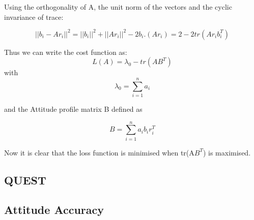 {{{Using the orthogonality of A, the unit norm of the vectors and the cyclic invariance of trace:

\begin{equation}
||b_{i}-Ar_{i}||^2 = ||b_{i}||^2 + ||Ar_{i}||^2 -2b_{i}.(Ar_{i}) = 2- 2 tr(Ar_{i}b_{i}^{T})
\end{equation}

Thus we can write the cost function as:
\begin{equation}
    L(A)= \lambda _{0} - tr(AB^{T})
\end{equation}
with
\begin{equation}
    \lambda_{0}= \sum_{i=1}^{n} a_{i}
\end{equation}

and the Attitude profile matrix B defined as 

\begin{equation}
    B= \sum_{i=1}^{n} a_{i} b_{i} r_{i}^{T}
\end{equation}

Now it is clear that the loss function is minimised when tr(A$B^T$) is maximised.

}



}

\subsection{QUEST}
{
}


\subsection{Attitude Accuracy}
{
}


}
